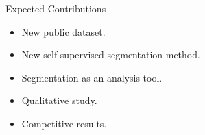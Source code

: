 \begin{frame}{Expected Contributions}
    \begin{itemize}
        \item New public dataset.
        \item New self-supervised segmentation method.
        \item Segmentation as an analysis tool.
        \item Qualitative study.
        \item Competitive results.
    \end{itemize}
\end{frame}
